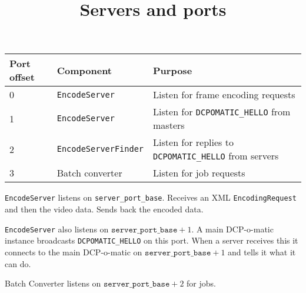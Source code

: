 \documentclass{article}
\title{Servers and ports}
\author{}
\date{}
\begin{document}
\maketitle

\begin{tabular}{|l|l|l|}
  \hline
  \textbf{Port offset} & \textbf{Component} & \textbf{Purpose} \\
  \hline
  0 & \texttt{EncodeServer} & Listen for frame encoding requests \\
  \hline
  1 & \texttt{EncodeServer} & Listen for \texttt{DCPOMATIC\_HELLO} from masters \\
  \hline
  2 & \texttt{EncodeServerFinder} & Listen for replies to \texttt{DCPOMATIC\_HELLO} from servers \\
  \hline
  3 & Batch converter & Listen for job requests \\
  \hline
\end{tabular}


\texttt{EncodeServer} listens on \texttt{server\_port\_base}.
Receives an XML \texttt{EncodingRequest} and then the video data.
Sends back the encoded data.

\texttt{EncodeServer} also listens on $\texttt{server\_port\_base} +
1$.  A main DCP-o-matic instance broadcasts \texttt{DCPOMATIC\_HELLO}
on this port.  When a server receives this it connects to the main
DCP-o-matic on $\texttt{server\_port\_base} + 1$ and tells it what it can do.

Batch Converter listens on $\texttt{server\_port\_base} + 2$ for jobs.
\end{document}
